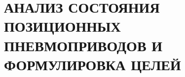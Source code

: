 \chapter{АНАЛИЗ СОСТОЯНИЯ ПОЗИЦИОННЫХ ПНЕВМОПРИВОДОВ И ФОРМУЛИРОВКА ЦЕЛЕЙ}\label{ch:ch1}

% 





% 
% 
